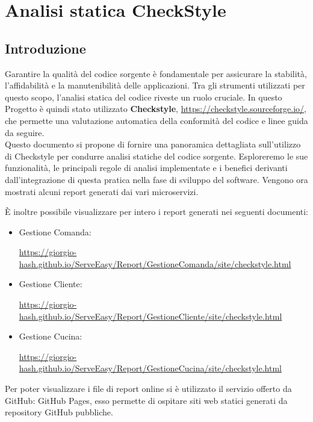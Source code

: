 \section{Analisi statica CheckStyle}

\subsection{Introduzione}

Garantire la qualità del codice sorgente è fondamentale per assicurare la stabilità, l'affidabilità e la manutenibilità delle applicazioni. Tra gli strumenti utilizzati per questo scopo, l'analisi statica del codice riveste un ruolo cruciale. In questo Progetto è quindi stato utilizzato \textbf{Checkstyle}, \href{https://checkstyle.sourceforge.io/}{https://checkstyle.sourceforge.io/}, che permette una valutazione automatica della conformità del codice e linee guida da seguire.
\\
Questo documento si propone di fornire una panoramica dettagliata sull'utilizzo di Checkstyle per condurre analisi statiche del codice sorgente. Esploreremo le sue funzionalità, le principali regole di analisi implementate e i benefici derivanti dall'integrazione di questa pratica nella fase di sviluppo del software. Vengono ora mostrati alcuni report generati dai vari microservizi.


È inoltre possibile visualizzare per intero i report generati nei seguenti documenti:


\begin{itemize}
	\item Gestione Comanda: 
	
	{\small 	\href{https://giorgio-hash.github.io/ServeEasy/Report/GestioneComanda/site/checkstyle.html}{https://giorgio-hash.github.io/ServeEasy/Report/GestioneComanda/site/checkstyle.html}}
	\item Gestione Cliente: 
	
	{\small 	\href{https://giorgio-hash.github.io/ServeEasy/Report/GestioneCliente/site/checkstyle.html}{https://giorgio-hash.github.io/ServeEasy/Report/GestioneCliente/site/checkstyle.html}}
	\item Gestione Cucina: 
	
	{\small \href{https://giorgio-hash.github.io/ServeEasy/Report/GestioneCucina/site/checkstyle.html}{https://giorgio-hash.github.io/ServeEasy/Report/GestioneCucina/site/checkstyle.html}}
\end{itemize}
Per poter visualizzare i file di report online si è utilizzato il servizio offerto da GitHub: GitHub Pages\cite{github-pages}, esso permette di ospitare siti web statici generati da repository GitHub pubbliche.

